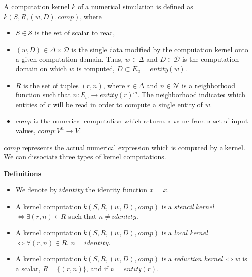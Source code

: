 \begin{mydef}
A computation kernel $k$ of a numerical simulation is defined as $k(S,R,(w,D),comp)$, where 
\begin{itemize}
\item $S \in \mathcal{S}$ is the set of scalar to read, 
\item $(w,D) \in \Delta \times \mathcal{D}$ is the single data modified by the computation kernel onto a given computation domain. Thus, $w \in \Delta$ and $D \in \mathcal{D}$ is the computation domain on which $w$ is computed, $D \subset E_w=entity(w)$.
\item $R$ is the set of tuples $(r,n)$, where $r \in \Delta$ and $n \in \mathcal{N}$ is a neighborhood function such that $n : E_w \rightarrow entity(r)^m$. The neighborhood indicates which entities of $r$ will be read in order to compute a single entity of $w$. 
\item $comp$ is the numerical computation which returns a value from a set of input values, $comp: V^n \rightarrow V$.
\end{itemize}
\end{mydef}

$comp$ represents the actual numerical expression which is computed by a kernel. We can dissociate three types of kernel computations.

\noindent \textbf{Definitions}
\begin{itemize}
\item We denote by $identity$ the identity function $x=x$.
\item A kernel computation $k(S,R,(w,D),comp)$ is a \emph{stencil kernel} $\iff \exists (r,n) \in R$ such that $n \neq identity$.
\item A kernel computation $k(S,R,(w,D),comp)$ is a \emph{local kernel} $\iff \forall (r,n) \in R$, $n = identity$.
\item A kernel computation $k(S,R,(w,D),comp)$ is a \emph{reduction kernel} $\iff w$ is a scalar, $R=\{(r,n)\}$, and if $n=entity(r)$.
\end{itemize}

